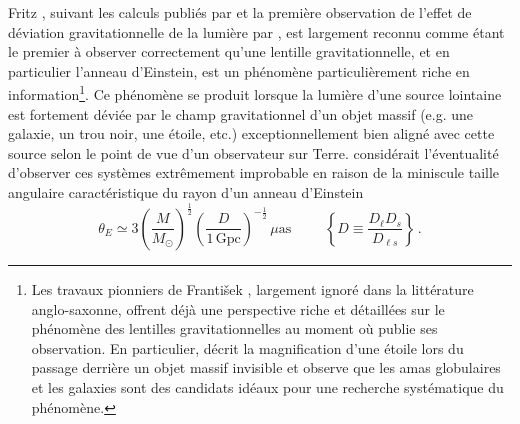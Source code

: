 Fritz \citet{Zwicky1937}, suivant les calculs publiés par \citet{Einstein1936} et la première observation 
de l'effet de déviation gravitationnelle de la lumière par \citet{Eddington1919}, 
est largement reconnu comme étant le premier à observer correctement qu'une lentille gravitationnelle, et en particulier 
l'anneau d'Einstein, 
est un phénomène particulièrement riche en information\footnote{ 
        Les travaux pionniers de Franti\v{s}ek \citep{Link1936,Link1937}, largement ignoré dans la littérature anglo-saxonne, %
        offrent déjà une perspective riche et détaillées sur le phénomène des lentilles gravitationnelles au moment où \citet{Zwicky1937} publie 
        ses observation. 
        En particulier, \citet{Link1936} décrit la magnification d'une étoile lors du passage derrière un objet massif invisible et 
        observe que les amas globulaires et les galaxies sont des candidats idéaux pour une recherche systématique du 
        phénomène.
        }. 
Ce phénomène se produit lorsque la lumière d'une source lointaine est fortement déviée par le champ gravitationnel d'un objet massif 
(e.g. une galaxie, un trou noir, une étoile, etc.) 
exceptionnellement bien aligné avec cette source selon le point de vue d'un observateur sur Terre.
\citet{Einstein1936} considérait l'éventualité d'observer ces systèmes extrêmement 
improbable en raison de la miniscule taille angulaire caractéristique du rayon d'un 
anneau d'Einstein \citep{Chwolson1924,Einstein1936} 
\begin{equation}\label{eq:Taille Lentille}
        \theta_E \simeq 3\left( \frac{M}{M_{\odot}} \right)^{\frac{1}{2}} \left( \frac{D}{1\, \mathrm{Gpc}} \right)^{-\frac{1}{2}}\, \mu\mathrm{as} \hspace{1cm} \left\{D \equiv \frac{D_{\ell} D_s}{D_{\ell s}}\right\}\, .
\end{equation}
